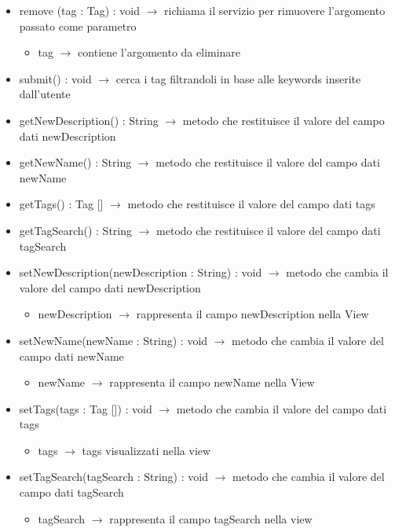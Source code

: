 \begin{description}
\begin{itemize}
	\item remove (tag : Tag) : void $\rightarrow$ richiama il servizio per rimuovere l'argomento passato come parametro\begin{itemize}
		\item tag $\rightarrow$ contiene l'argomento da eliminare 
	\end{itemize}
	
	\item submit() : void $\rightarrow$ cerca i tag filtrandoli in base alle keywords inserite dall'utente
	\item getNewDescription() : String $\rightarrow$ metodo che restituisce il valore del campo dati newDescription
	\item getNewName() : String $\rightarrow$ metodo che restituisce il valore del campo dati newName
	\item getTags() : Tag [] $\rightarrow$ metodo che restituisce il valore del campo dati tags
	\item getTagSearch() : String $\rightarrow$ metodo che restituisce il valore del campo dati tagSearch
	\item setNewDescription(newDescription : String) : void $\rightarrow$ metodo che cambia il valore del campo dati newDescription\begin{itemize}
		\item newDescription $\rightarrow$ rappresenta il campo newDescription nella View
	\end{itemize}
	
	\item setNewName(newName : String) : void $\rightarrow$ metodo che cambia il valore del campo dati newName\begin{itemize}
		\item newName $\rightarrow$ rappresenta il campo newName nella View
	\end{itemize}
	
	\item setTags(tags : Tag []) : void $\rightarrow$ metodo che cambia il valore del campo dati tags\begin{itemize}
		\item tags $\rightarrow$ tags visualizzati nella view
	\end{itemize}
	
	\item setTagSearch(tagSearch : String) : void $\rightarrow$ metodo che cambia il valore del campo dati tagSearch\begin{itemize}
		\item tagSearch $\rightarrow$ rappresenta il campo tagSearch nella view
	\end{itemize}
	
\end{itemize}

\end{description}

